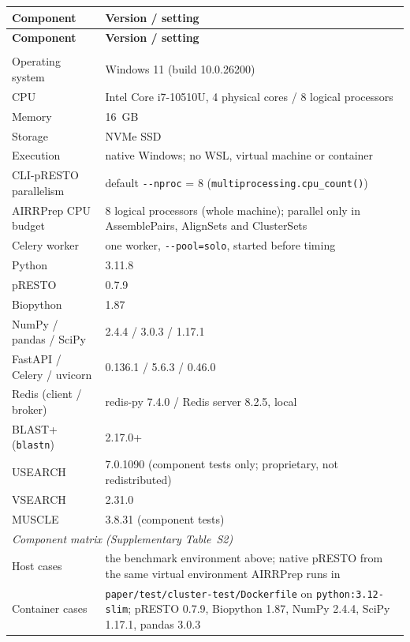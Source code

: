 \documentclass[11pt]{article}
\begin{document}
\begin{landscape}
\begin{longtable}{p{}p{}}
\toprule
\textbf{Component} & \textbf{Version / setting} \\
\midrule
\endfirsthead
\toprule
\textbf{Component} & \textbf{Version / setting} \\
\midrule
\endhead
\bottomrule
\endfoot
\multicolumn{2}{l}{\textit{Benchmark environment (Supplementary Table~S8)}} \\
Operating system & Windows 11 (build 10.0.26200) \\
CPU & Intel Core i7-10510U, 4 physical cores / 8 logical processors \\
Memory & 16~GB \\
Storage & NVMe SSD \\
Execution & native Windows; no WSL, virtual machine or container \\
CLI-pRESTO parallelism & default \texttt{-{}-nproc} = 8 (\texttt{multiprocessing.cpu\_count()}) \\
AIRRPrep CPU budget & 8 logical processors (whole machine); parallel only in AssemblePairs, AlignSets and ClusterSets \\
Celery worker & one worker, \texttt{-{}-pool=solo}, started before timing \\
Python & 3.11.8 \\
pRESTO & 0.7.9 \\
Biopython & 1.87 \\
NumPy / pandas / SciPy & 2.4.4 / 3.0.3 / 1.17.1 \\
FastAPI / Celery / uvicorn & 0.136.1 / 5.6.3 / 0.46.0 \\
Redis (client / broker) & redis-py 7.4.0 / Redis server 8.2.5, local \\
BLAST+ (\texttt{blastn}) & 2.17.0+ \\
USEARCH & 7.0.1090 (component tests only; proprietary, not redistributed) \\
VSEARCH & 2.31.0 \\
MUSCLE & 3.8.31 (component tests) \\
\midrule
\multicolumn{2}{l}{\textit{Component matrix (Supplementary Table~S2)}} \\
Host cases & the benchmark environment above; native pRESTO from the same virtual environment AIRRPrep runs in \\
Container cases & \texttt{paper/test/cluster-test/Dockerfile} on \texttt{python:3.12-slim}; pRESTO 0.7.9, Biopython 1.87, NumPy 2.4.4, SciPy 1.17.1, pandas 3.0.3 \\

\end{longtable}
\end{landscape}
\end{document}
